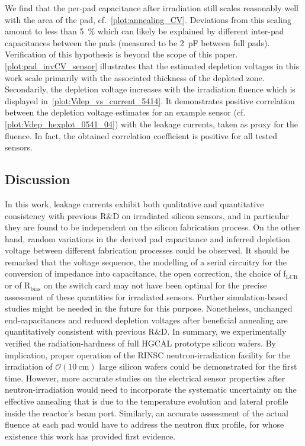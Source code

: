 We find that the per-pad capacitance after irradiation still scales reasonably well with the area of the pad, cf.~\ref{plot:annealing_CV}.
Deviations from this scaling amount to less than \SI{5}{\percent} which can likely be explained by different inter-pad capacitances between the pads (measured to be \SI{2}{\pico\farad} between full pads).
Verification of this hypothesis is beyond the scope of this paper. 
\ref{plot:pad_invCV_sensor} illustrates that the estimated depletion voltages in this work scale primarily with the associated thickness of the depleted zone. 
Secondarily, the depletion voltage increases with the irradiation fluence which is displayed in~\ref{plot:Vdep_vs_current_5414}.
It demonstrates positive correlation between the depletion voltage estimates for an example sensor (cf. \ref{plot:Vdep_hexplot_0541_04}) with the leakage currents, taken as proxy for the fluence.
In fact, the obtained correlation coefficient is positive for all tested sensors.

\subsection{Discussion}
\label{subsec:discussion}
In this work, leakage currents exhibit both qualitative and quantitative consistency with previous R$\&$D on irradiated silicon sensors, and in particular they are found to be independent on the silicon fabrication process.
On the other hand, random variations in the derived pad capacitance and inferred depletion voltage between different fabrication processes could be observed. 
It should be remarked that the voltage sequence, the modelling of a serial circuitry for the conversion of impedance into capacitance, the open correction, the choice of f$_\text{LCR}$ or of R$_\text{bias}$ on the switch card may not have been optimal for the precise assessment of these quantities for irradiated sensors.
Further simulation-based studies might be needed in the future for this purpose.
Nonetheless, unchanged end-capacitances and reduced depletion voltages after beneficial annealing are quantitatively consistent with previous R$\&$D.
In summary, we experimentally verified the radiation-hardness of full HGCAL prototype silicon wafers.
By implication, proper operation of the RINSC neutron-irradiation facility for the irradiation of $\mathcal{O}(\SI{10}{\centi\metre})$ large silicon wafers could be demonstrated for the first time.
However, more accurate studies on the electrical sensor properties after neutron-irradiation would need to incorporate the systematic uncertainty on the effective annealing that is due to the temperature evolution and lateral profile inside the reactor's beam port.
Similarly, an accurate assessment of the actual fluence at each pad would have to address the neutron flux profile, for whose existence this work has provided first evidence.